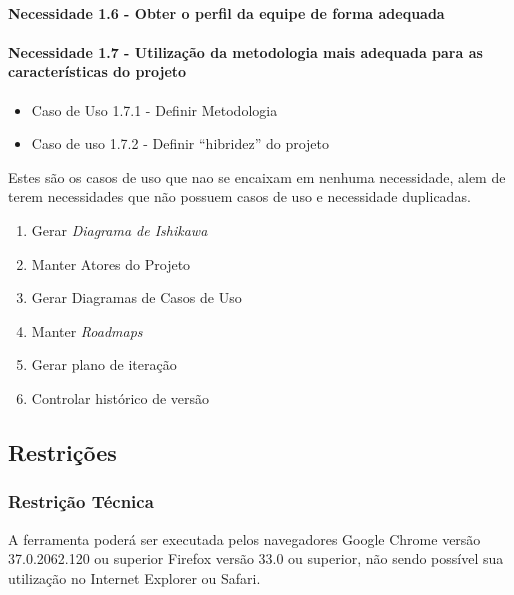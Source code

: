 \paragraph{Necessidade 1.6 - Obter o perfil da equipe de forma adequada\\}

\paragraph{Necessidade 1.7 - Utilização da metodologia mais adequada para as características do projeto\\}

	\begin{itemize}
	\item Caso de Uso 1.7.1 - Definir Metodologia
	\item Caso de uso 1.7.2 - Definir ``hibridez'' do projeto
	\end{itemize}

 Estes são os casos de uso que nao se encaixam em nenhuma necessidade, alem de terem necessidades que não possuem casos de uso e necessidade duplicadas.

\begin{enumerate}

	\item Gerar \textit{Diagrama de Ishikawa}
	\item Manter Atores do Projeto
	\item Gerar Diagramas de Casos de Uso
	\item Manter \textit{Roadmaps}
	\item Gerar plano de iteração
	
	\item Controlar histórico de versão
\end{enumerate}
\subsection{Restrições}
\subsubsection{Restrição Técnica}

A ferramenta poderá ser executada pelos navegadores Google Chrome versão 37.0.2062.120 ou superior Firefox versão 33.0 ou superior, não sendo possível sua utilização no Internet Explorer ou Safari.

